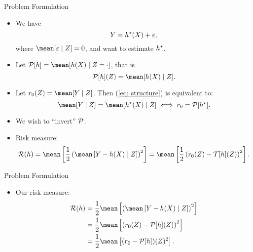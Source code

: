 \documentclass[aspectratio=169]{beamer}
\begin{document}
    \begin{frame}{Problem Formulation}
        \begin{itemize}
            \item<1-> We have
                \begin{equation}
                    \label{eq: structure}
                    Y = h^{ \star } ( X ) + \varepsilon   
                ,\end{equation}
                 where $ \mean [ \varepsilon \mid Z ] = 0 $, and want to estimate $ h^{ \star } $.
             \item<2-> Let $ \meanop [ h ] = \mean [ h ( X ) \mid Z = \cdot ] $, that is
                 \begin{equation*}
                     \meanop [ h ] ( Z ) = \mean [ h ( X ) \mid Z ]
                 .\end{equation*}
             \item<3-> Let $ r_{ 0 } ( Z ) = \mean [ Y \mid Z ] $.
                 Then (\ref{eq: structure}) is equivalent to:
                 \begin{equation*}
                     \mean [ Y \mid Z ] = \mean [ \hstar ( X ) \mid Z ] \iff r_{ 0 } = \meanop [ \hstar ]
                 .\end{equation*}
            \item<4-> We wish to ``invert'' $ \mathcal{P} $.
            \item<4-> Risk measure:
                \begin{equation*}
                    \risk ( h ) = \mean \left[ \frac{ 1 }{ 2 } \left( \mean \left[ Y - h ( X ) \mid Z \right] \right)^2 \right] = \mean \left[ \frac{ 1 }{ 2 } \left( r_{ 0 } ( Z ) - \mathcal{T} [ h ] ( Z ) \right)^2 \right]
                .\end{equation*}
        \end{itemize}
    \end{frame}
    \begin{frame}{Problem Formulation}
        \begin{itemize}
            \item<1-> Our risk measure:
                \begin{align*}
                    \risk ( h )
                    &= \frac{ 1 }{ 2 } \mean \left[
                        \left(
                            \mean \left[
                                Y - h ( X ) \mid Z
                            \right]
                        \right)^2
                    \right] \\
                    &= \frac{ 1 }{ 2 } \mean \left[
                        \left(
                            r_{ 0 } ( Z ) - \meanop [ h ] ( Z )
                        \right)^2
                    \right] \\
                    &= \frac{ 1 }{ 2 } \mean \left[
                        ( r_{ 0 }  - \meanop [ h ] ) ( Z )^2
                    \right]
                .\end{align*}
        \end{itemize}
    \end{frame}
\end{document}
